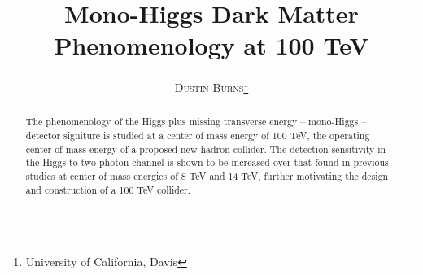\documentclass[twoside]{article}
\title{\vspace{-15mm}\fontsize{16pt}{10pt}\selectfont\textbf{Mono-Higgs Dark Matter Phenomenology at 100 TeV}} %
\author{
\large
\textsc{Dustin Burns}\thanks{University of California, Davis}\\[2mm]
\vspace{-5mm}
}
\begin{document}
\maketitle 

\begin{abstract}

\noindent The phenomenology of the Higgs plus missing transverse energy -- mono-Higgs -- detector signiture is studied at a center of mass energy of 100 TeV, the operating center of mass energy of a proposed new hadron collider. The detection sensitivity in the Higgs to two photon channel is shown to be increased over that found in previous studies at center of mass energies of 8 TeV and 14 TeV,  further motivating the design and construction of a 100 TeV collider.  

\end{abstract}
\end{document}
